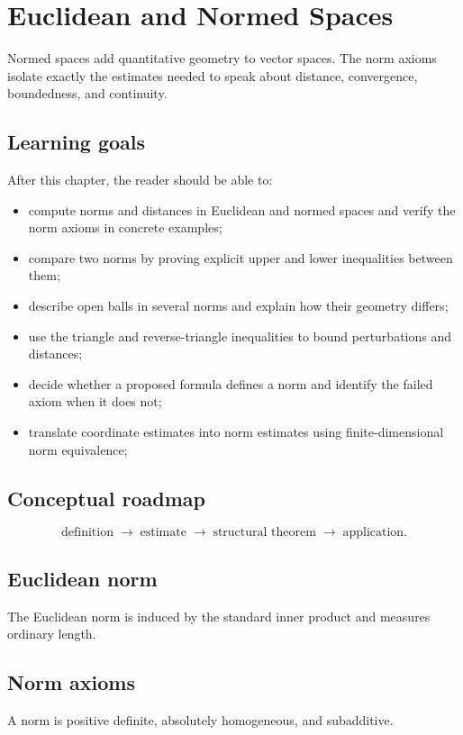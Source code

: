 \chapter{Euclidean and Normed Spaces}
\label{ch:ii02}

Normed spaces add quantitative geometry to vector spaces. The norm axioms isolate exactly the estimates needed to speak about distance, convergence, boundedness, and continuity.

\section*{Learning goals}
After this chapter, the reader should be able to:
\begin{itemize}
\item compute norms and distances in Euclidean and normed spaces and verify the norm axioms in concrete examples;
\item compare two norms by proving explicit upper and lower inequalities between them;
\item describe open balls in several norms and explain how their geometry differs;
\item use the triangle and reverse-triangle inequalities to bound perturbations and distances;
\item decide whether a proposed formula defines a norm and identify the failed axiom when it does not;
\item translate coordinate estimates into norm estimates using finite-dimensional norm equivalence;
\end{itemize}
\section*{Conceptual roadmap}
\[
\boxed{\text{definition}\;\longrightarrow\;\text{estimate}\;\longrightarrow\;\text{structural theorem}\;\longrightarrow\;\text{application}.}
\]

\section{Euclidean norm}
The Euclidean norm is induced by the standard inner product and measures ordinary length.

\section{Norm axioms}
A norm is positive definite, absolutely homogeneous, and subadditive.

